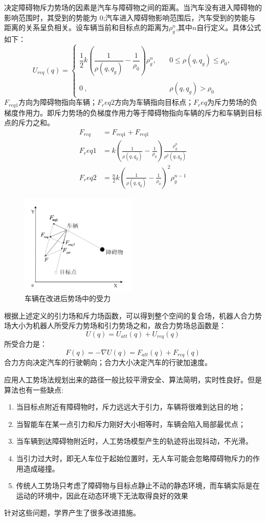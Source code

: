 \documentclass{report}
\begin{document}
决定障碍物斥力势场的因素是汽车与障碍物之间的距离。当汽车没有进入障碍物的影响范围时，其受到的势能为 0;汽车进入障碍物影响范围后，汽车受到的势能与距离的关系呈负相关。设车辆当前和目标点的距离为$\rho_g^n$,其中$n$自行定义。具体公式如下：
$$U_{req}(q)=\begin{cases}\dfrac{1}{2}k\left(\dfrac{1}{\rho(q,q_g)}-\dfrac{1}{\rho_0}\right)\rho_g^n,&\quad0\leq\rho(q,q_g)\leq\rho_0,\\\\0\:,&\quad\rho(q,q_g)>\rho_0\end{cases}$$
$F_{req1}$方向为障碍物指向车辆；$F_req2$方向为车辆指向目标点；$F_req$为斥力势场的负梯度作用力。即斥力势场的负梯度作用力等于障碍物指向车辆的斥力和车辆到目标点的斥力之和。
\begin{align}
  \label{}
F_{req}&=F_{req1}+F_{req1}\\
F_req1&=k\left(\frac1{\rho(q,q_g)}-\frac1{\rho_0}\right)\frac{\rho_g^n}{\rho^2(q,q_g)}\\
F_req2&=\frac n2k\left(\frac1{\rho(q,q_g)}-\frac1{\rho_0}\right)^2\rho_g^{n-1}
\end{align}
\begin{figure}[ht]
  \centering
  \includegraphics[width=0.5\textwidth]{figures/APF.png}
  \caption{车辆在改进后势场中的受力}
\end{figure}

根据上述定义的引力场和斥力场函数，可以得到整个空间的复合场，机器人合力势场大小为机器人所受斥力势场和引力势场之和，故合力势场总函数是：
\[ U(q)=U_{att}(q)+U_{req}(q) \]
所受合力是：
\[ F(q)=-\nabla U(q)=F_{att}(q)+F_{req}(q) \]
合力方向决定汽车的行驶朝向；合力大小决定汽车的行驶加速度。

应用人工势场法规划出来的路径一般比较平滑安全、算法简明，实时性良好。但是算法也有一些缺点:
\begin{enumerate}
\item 当目标点附近有障碍物时，斥力远远大于引力，车辆将很难到达目的地；
\item 当智能车在某一点引力和斥力刚好大小相等时，车辆会陷入局部最优点；
\item 当车辆到达障碍物附近时，人工势场模型产生的轨迹将出现抖动，不光滑\cite{jh8}。
\item 当引力过大时，即无人车位于起始位置时，无人车可能会忽略障碍物斥力的作用造成碰撞\cite{jh7}。
  \item 传统人工势场只考虑了障碍物与目标点静止不动的静态环境，而车辆实际是在运动的环境中，因此在动态环境下无法取得良好的效果
\end{enumerate}
针对这些问题，学界产生了很多改进措施。
\end{document}
